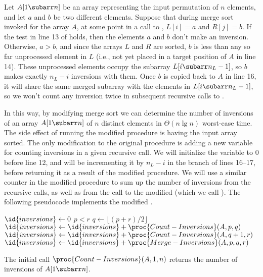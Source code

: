 Let $A[1\subarr n]$ be an array representing the input permutation of $n$ elements, and let $a$ and $b$ be two different elements.
Suppose that during merge sort invoked for the array $A$, at some point in a call to , $L[i]=a$ and $R[j]=b$.
If the test in line 13 of  holds, then the elements $a$ and $b$ don't make an inversion.
Otherwise, $a>b$, and since the arrays $L$ and $R$ are sorted, $b$ is less than any so far unprocessed element in $L$ (i.e., not yet placed in a target position of $A$ in line 14).
These unprocessed elements occupy the subarray $L[i\subarr n_L-1]$, so $b$ makes exactly $n_L-i$ inversions with them.
Once $b$ is copied back to $A$ in line 16, it will share the same merged subarray with the elements in $L[i\subarr n_L-1]$, so we won't count any inversion twice in subsequent recursive calls to .

In this way, by modifying merge sort we can determine the number of inversions of an array $A[1\subarr n]$ of $n$ distinct elements in $\Theta(n\lg n)$ worst-case time.
The side effect of running the modified procedure is having the input array sorted.
The only modification to the original  procedure is adding a new variable for counting inversions in a given recursive call.
We will initialize the variable to 0 before line 12, and will be incrementing it by $n_L-i$ in the  branch of lines 16--17, before returning it as a result of the modified procedure.
We will use a similar counter in the modified  procedure to sum up the number of inversions from the recursive calls, as well as from the call to the modified  (which we call ).
The following pseudocode implements the modified .

\begin{codebox}
\li $\id{inversions}\gets0$
\li \If $p<r$
\li     \Then $q\gets\lfloor(p+r)/2\rfloor$
\li         $\id{inversions}\gets\id{inversions}+\proc{Count-Inversions}(A,p,q)$
\li         $\id{inversions}\gets\id{inversions}+\proc{Count-Inversions}(A,q+1,r)$
\li         $\id{inversions}\gets\id{inversions}+\proc{Merge-Inversions}(A,p,q,r)$
        \End
\li \Return {}
\end{codebox}

The initial call $\proc{Count-Inversions}(A,1,n)$ returns the number of inversions of $A[1\subarr n]$.

